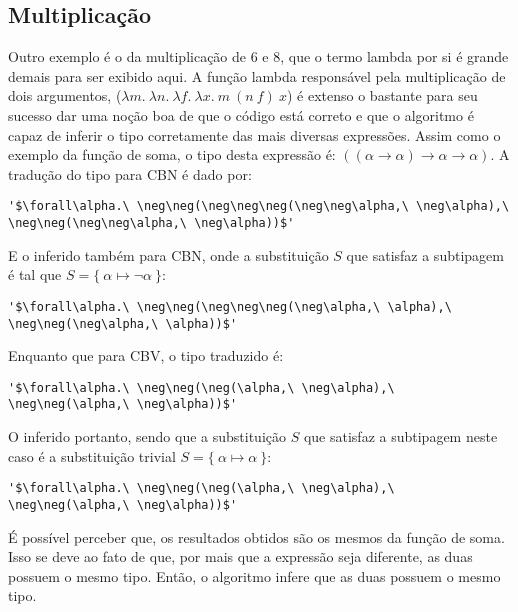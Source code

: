 \subsection{Multiplicação}
Outro exemplo é o da multiplicação de 6 e 8, que o termo lambda por si é grande demais para ser exibido aqui.
A função lambda responsável pela multiplicação de dois argumentos, ($\lambda m.\ \lambda n.\ \lambda f.\ \lambda x.\ m\ (n\ f)\ x$) é extenso o bastante para seu sucesso dar uma noção boa de que o código está correto e que o algoritmo é capaz de inferir o tipo corretamente das mais diversas expressões.
Assim como o exemplo da função de soma, o tipo desta expressão é: $((\alpha \to \alpha) \to \alpha \to \alpha)$.
A tradução do tipo para CBN é dado por:
\lstset{extendedchars=false, escapeinside=''}
\begin{lstlisting}[style=output,caption={Tradução em CBN do tipo da função de soma}]
  '$\forall\alpha.\ \neg\neg(\neg\neg\neg(\neg\neg\alpha,\ \neg\alpha),\ \neg\neg(\neg\neg\alpha,\ \neg\alpha))$'
\end{lstlisting}
E o inferido também para CBN, onde a substituição $S$ que satisfaz a subtipagem é tal que $S = \{\ \alpha \mapsto \neg\alpha\ \}$:
\lstset{extendedchars=false, escapeinside=''}
\begin{lstlisting}[style=output,caption={Inferência do tipo da função de soma traduzido em CBN}]
  '$\forall\alpha.\ \neg\neg(\neg\neg\neg(\neg\alpha,\ \alpha),\ \neg\neg(\neg\alpha,\ \alpha))$'
\end{lstlisting}
Enquanto que para CBV, o tipo traduzido é:
\lstset{extendedchars=false, escapeinside=''}
\begin{lstlisting}[style=output,caption={Tradução em CBV do tipo da função de soma}]
  '$\forall\alpha.\ \neg\neg(\neg(\alpha,\ \neg\alpha),\ \neg\neg(\alpha,\ \neg\alpha))$'
\end{lstlisting}
O inferido portanto, sendo que a substituição $S$ que satisfaz a subtipagem neste caso é a substituição trivial $S = \{\ \alpha \mapsto \alpha\ \}$:
\lstset{extendedchars=false, escapeinside=''}
\begin{lstlisting}[style=output,caption={Inferência do tipo da função de soma traduzido em CBV}]
  '$\forall\alpha.\ \neg\neg(\neg(\alpha,\ \neg\alpha),\ \neg\neg(\alpha,\ \neg\alpha))$'
\end{lstlisting}
É possível perceber que, os resultados obtidos são os mesmos da função de soma.
Isso se deve ao fato de que, por mais que a expressão seja diferente, as duas possuem o mesmo tipo.
Então, o algoritmo infere que as duas possuem o mesmo tipo.

